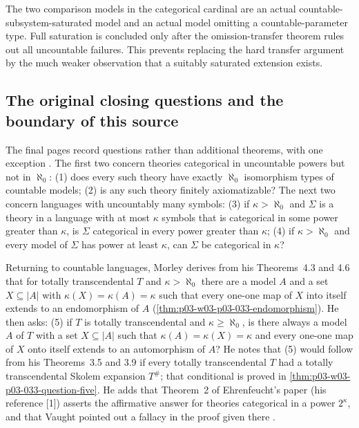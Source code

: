 The two comparison models in the categorical cardinal are an actual
countable-subsystem-saturated model and an actual model omitting a
countable-parameter type. Full saturation is concluded only after
the omission-transfer theorem rules out all uncountable failures.
This prevents replacing the hard transfer argument by the much
weaker observation that a suitably saturated extension exists.

\subsection{The original closing questions and the boundary of this source}
\label{sec:p03-morley-closing-questions}

The final pages record questions rather than additional theorems,
with one exception \cite[pp.~537--538]{Morley1965}. The first two concern
theories categorical in uncountable powers but not in \(\aleph_0\):
(1) does every such theory have exactly \(\aleph_0\) isomorphism types
of countable models; (2) is any such theory finitely axiomatizable? The
next two concern languages with uncountably many symbols: (3) if
\(\kappa>\aleph_0\) and \(\Sigma\) is a theory in a language with at
most \(\kappa\) symbols that is categorical in some power greater than
\(\kappa\), is \(\Sigma\) categorical in every power greater than
\(\kappa\); (4) if \(\kappa>\aleph_0\) and every model of \(\Sigma\) has
power at least \(\kappa\), can \(\Sigma\) be categorical in \(\kappa\)?

Returning to countable languages, Morley derives from his Theorems~4.3
and 4.6 that for totally transcendental \(T\) and \(\kappa>\aleph_0\)
there are a model \(A\) and a set \(X\subseteq|A|\) with
\(\kappa(X)=\kappa(A)=\kappa\) such that every one-one map of \(X\) into
itself extends to an endomorphism of \(A\)
(\cref{thm:p03-w03-p03-033-endomorphism}). He then asks:
(5) if \(T\) is totally transcendental and \(\kappa\geq\aleph_0\), is
there always a model \(A\) of \(T\) with a set \(X\subseteq|A|\) such
that \(\kappa(A)=\kappa(X)=\kappa\) and every one-one map of \(X\) onto
itself extends to an automorphism of \(A\)? He notes that (5) would follow
from his Theorems~3.5 and 3.9 if every totally transcendental \(T\) had
a totally transcendental Skolem expansion \(T^\#\); that conditional is
proved in \cref{thm:p03-w03-p03-033-question-five}. He adds that
Theorem~2 of Ehrenfeucht's paper (his reference [1]) asserts the
affirmative answer for theories categorical in a power \(2^\kappa\), and
that Vaught pointed out a fallacy in the proof given there
\cite[p.~537]{Morley1965}.

